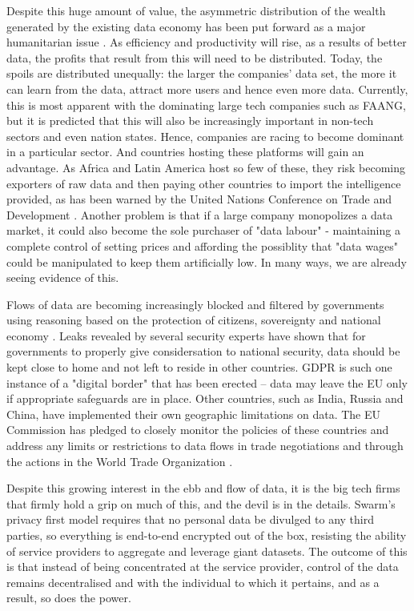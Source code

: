 Despite this huge amount of value, the asymmetric distribution of the wealth generated by the existing data economy has been put forward as a major humanitarian issue \cite{TheWinner2020Feb}. As efficiency and productivity will rise, as a results of better data, the profits that result from this will need to be distributed. Today, the spoils are distributed unequally: the larger the companies' data set, the more it can learn from the data, attract more users and hence even more data. Currently, this is most apparent with the dominating large tech companies such as FAANG, but it is predicted that this will also be increasingly important in non-tech sectors and even nation states. Hence, companies are racing to become dominant in a particular sector. And countries hosting these platforms will gain an advantage. As Africa and Latin America host so few of these, they risk becoming exporters of raw data and then paying other countries to import the intelligence provided, as has been warned by the United Nations Conference on Trade and Development \cite{TheWinner2020Feb}. Another problem is that if a large company monopolizes a data market, it could also become the sole purchaser of "data labour" - maintaining a complete control of setting prices and affording the possiblity that "data wages" could be manipulated to keep them artificially low. In many ways, we are already seeing evidence of this. 


Flows of data are becoming increasingly blocked and filtered by governments using reasoning based on the protection of citizens, sovereignty and national economy \cite{VirtualNationalism2020Feb}. Leaks revealed by several security experts have shown that for governments to properly give considersation to national security,  data should be kept close to home and not left to reside in other countries. GDPR is such one instance of a "digital border" that has been erected -- data may leave the EU only if appropriate safeguards are in place. Other countries, such as India, Russia and China, have implemented their own geographic limitations on data. The EU Commission has pledged to closely monitor the policies of these countries and address any limits or restrictions to data flows in trade negotiations and through the actions in the World Trade Organization \cite{EUWhitePaperAI2020Feb}.

Despite this growing interest in the ebb and flow of data, it is the big tech firms that firmly hold a grip on much of this, and the devil is in the details. Swarm's privacy first model requires that no personal data be divulged to any third parties, so everything is end-to-end encrypted out of the box, resisting the ability of service providers to aggregate and leverage giant datasets. The outcome of this is that instead of being concentrated at the service provider, control of the data remains decentralised and with the individual to which it pertains, and as a result, so does the power.

